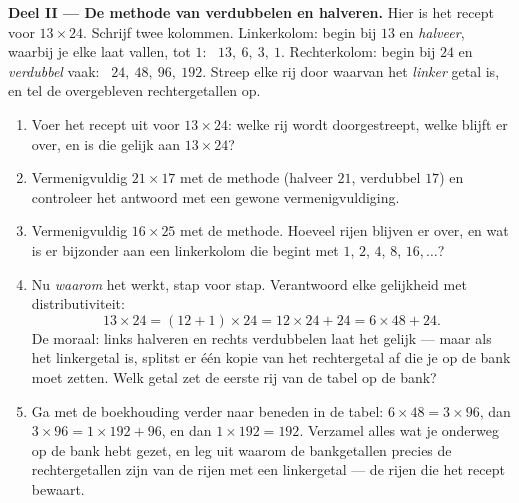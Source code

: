 \begin{problem}
\medskip
\noindent\textbf{Deel II --- De methode van verdubbelen en halveren.}
Hier is het recept voor $13 \times 24$. Schrijf twee kolommen. Linkerkolom:
begin bij $13$ en \emph{halveer}, waarbij je elke  laat vallen, tot $1$:
\ $13,\ 6,\ 3,\ 1$. Rechterkolom: begin bij $24$ en \emph{verdubbel}  vaak:
\ $24,\ 48,\ 96,\ 192$. Streep elke rij door waarvan het \emph{linker} getal 
is, en tel de overgebleven rechtergetallen op.
\begin{enumerate}[resume]
  \item Voer het recept uit voor $13 \times 24$: welke rij wordt doorgestreept,
        welke  blijft er over, en is die gelijk aan $13 \times 24$?
  \item Vermenigvuldig $21 \times 17$ met de methode (halveer $21$, verdubbel
        $17$) en controleer het antwoord met een gewone vermenigvuldiging.
  \item Vermenigvuldig $16 \times 25$ met de methode. Hoeveel rijen blijven er
        over, en wat is er bijzonder aan een linkerkolom die begint met $1$, $2$,
        $4$, $8$, $16, \dots$?
  \item Nu \emph{waarom} het werkt, stap voor stap. Verantwoord elke gelijkheid
        met distributiviteit:
        \[
        13 \times 24 = (12 + 1) \times 24
        = 12 \times 24 + 24 = 6 \times 48 + 24 .
        \]
        De moraal: links halveren en rechts verdubbelen laat het  gelijk
        --- maar als het linkergetal \emph{} is, splitst er één kopie van
        het rechtergetal af die je op de bank moet zetten. Welk getal zet de
        eerste rij van de tabel op de bank?
  \item Ga met de boekhouding verder naar beneden in de tabel:
        $6 \times 48 = 3 \times 96$, dan $3 \times 96 = 1 \times 192 + 96$, en
        dan $1 \times 192 = 192$. Verzamel alles wat je onderweg op de bank hebt
        gezet, en leg uit waarom de bankgetallen precies de rechtergetallen zijn
        van de rijen met een  linkergetal --- de rijen die het recept
        bewaart.
\end{enumerate}


\end{problem}
